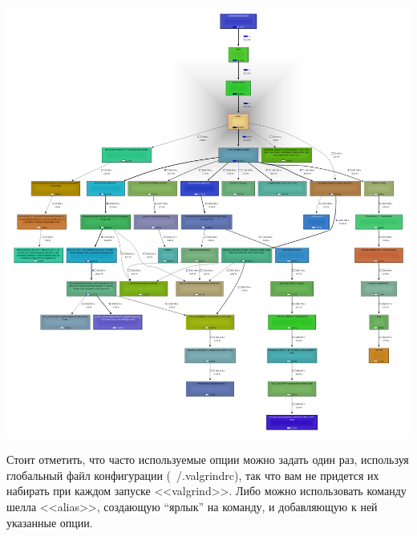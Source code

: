 \documentclass[12pt]{article}
\begin{document}
\includegraphics*[scale=0.22]{./main_only.png}

Стоит отметить, что часто используемые опции можно задать один раз, используя глобальный файл конфигурации (~/.valgrindrc), так что вам не придется их набирать при каждом запуске <<valgrind>>. Либо можно использовать команду шелла <<alias>>, создающую ``ярлык'' на команду, и добавляющую к ней указанные опции.
\end{document}
